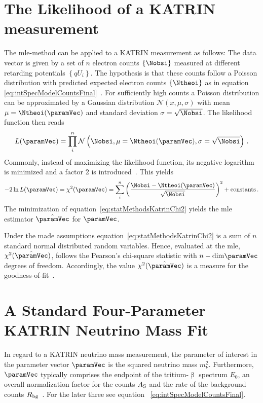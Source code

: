 \section{The Likelihood of a KATRIN measurement}
\label{sec:statMethodsKATRINLikelihood}
The \gls{mle}-method can be applied to a KATRIN measurement as follows: The data vector is given by a set of $n$ electron counts $\left\{\Nobsi\right\}$ measured at different retarding potentials $\left\{qU_i\right\}$. The hypothesis is that these counts follow a Poisson distribution with predicted expected electron counts $\left\{\Ntheoi\right\}$ as in equation \eqref{eq:intSpecModelCountsFinal}~\cite{Kleesiek2014}. For sufficiently high counts a Poisson distribution can be approximated by a Gaussian distribution $\mathcal{N}(x,\mu, \sigma)$ with mean $\mu=\Ntheoi(\paramVec)$ and standard deviation $\sigma=\sqrt{\Nobsi}$.  The likelihood function then reads
\begin{equation}
	\label{eq:KATRINlikelihood}
	L(\paramVec) = \prod_{i}^{n} \mathcal{N}\left(\Nobsi,\mu=\Ntheoi(\paramVec), \sigma=\sqrt{\Nobsi}\right)
	\fullstop
\end{equation}
Commonly, instead of maximizing the likelihood function, its negative logarithm is minimized and a factor 2 is introduced~\cite{ReviewOfParticlePhysics}. This yields
\begin{equation}
	\label{eq:statMethodsKatrinChi2}
	-2\ln L(\paramVec) = \chi^2(\paramVec) = \sum_i^n
		\left( 
			\frac{\Nobsi-\Ntheoi(\paramVec)}{\sqrt{\Nobsi}}
		\right)^2
		 + \mathrm{constants}
		\fullstop
\end{equation}
The minimization of equation~\eqref{eq:statMethodsKatrinChi2} yields the \gls{mle} estimator $\hat{\paramVec}$ for $\paramVec$.

Under the made assumptions equation~\eqref{eq:statMethodsKatrinChi2} is a sum of $n$ standard normal distributed random variables. Hence, evaluated at the \gls{mle},  $\chi^2(\hat{\paramVec})$, follows the Pearson's chi-square statistic with $n-\mathrm{dim}\paramVec$ degrees of freedom. Accordingly, the value $\chi^2(\hat{\paramVec})$ is a measure for the goodness-of-fit~\cite{ReviewOfParticlePhysics}.

\section{A Standard Four-Parameter KATRIN Neutrino Mass Fit}
\label{sec:statMethodsStandardFit}
In regard to a KATRIN neutrino mass measurement, the parameter of interest in the parameter vector $\paramVec$ is the squared neutrino mass $m_\nu^2$. Furthermore, $\paramVec$ typically comprises the endpoint of the tritium-$\upbeta$ spectrum $E_0$, an overall normalization factor for the counts $A_\mathrm{S}$ and the rate of the background counts $R_\mathrm{bg}$~\cite{Kleesiek2014}. For the later three see equation ~\eqref{eq:intSpecModelCountsFinal}.

